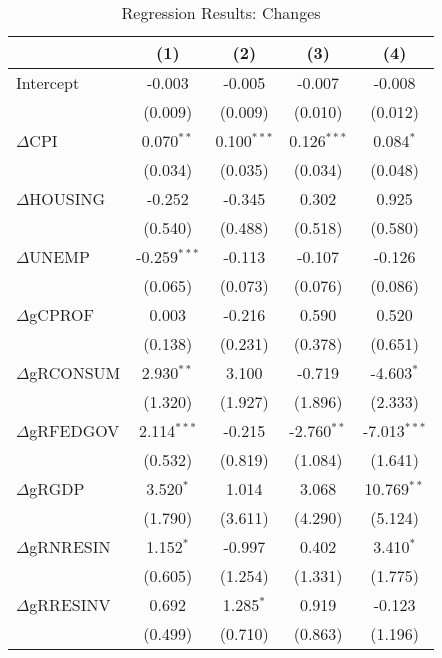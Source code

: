 \begin{table}[H]
\centering
\caption{Regression Results: Changes}
\begin{tabular}{@{\extracolsep{5pt}}lcccc}
\hline
\hline
& (1) & (2) & (3) & (4) \\
\hline
Intercept & -0.003 & -0.005 & -0.007 & -0.008 \\
          & (0.009) & (0.009) & (0.010) & (0.012) \\

$\Delta$CPI & 0.070$^{**}$ & 0.100$^{***}$ & 0.126$^{***}$ & 0.084$^{*}$ \\
            & (0.034) & (0.035) & (0.034) & (0.048) \\

$\Delta$HOUSING & -0.252 & -0.345 & 0.302 & 0.925 \\
                & (0.540) & (0.488) & (0.518) & (0.580) \\

$\Delta$UNEMP & -0.259$^{***}$ & -0.113 & -0.107 & -0.126 \\
              & (0.065) & (0.073) & (0.076) & (0.086) \\

$\Delta$gCPROF & 0.003 & -0.216 & 0.590 & 0.520 \\
               & (0.138) & (0.231) & (0.378) & (0.651) \\

$\Delta$gRCONSUM & 2.930$^{**}$ & 3.100 & -0.719 & -4.603$^{*}$ \\
                 & (1.320) & (1.927) & (1.896) & (2.333) \\

$\Delta$gRFEDGOV & 2.114$^{***}$ & -0.215 & -2.760$^{**}$ & -7.013$^{***}$ \\
                 & (0.532) & (0.819) & (1.084) & (1.641) \\

$\Delta$gRGDP & 3.520$^{*}$ & 1.014 & 3.068 & 10.769$^{**}$ \\
              & (1.790) & (3.611) & (4.290) & (5.124) \\

$\Delta$gRNRESIN & 1.152$^{*}$ & -0.997 & 0.402 & 3.410$^{*}$ \\
                 & (0.605) & (1.254) & (1.331) & (1.775) \\

$\Delta$gRRESINV & 0.692 & 1.285$^{*}$ & 0.919 & -0.123 \\
                 & (0.499) & (0.710) & (0.863) & (1.196) \\


\end{tabular}
\end{table}

